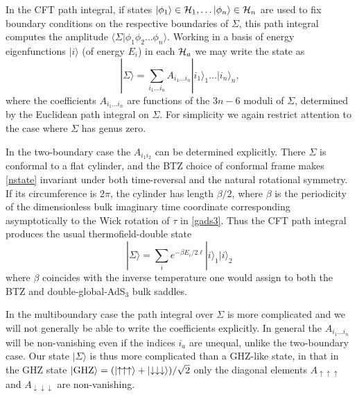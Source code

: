 \documentclass[12pt]{article}
\newcommand{\be}{\begin{equation}}
\newcommand{\ee}{\end{equation}}
\numberwithin{equation}{section}
\begin{document}
In the CFT path integral, if states $|\phi_1\rangle \in {\cal H}_1, \dots |\phi_n\rangle \in {\cal H}_n$ are used to fix boundary conditions on the respective boundaries of $\Sigma$, this path integral computes the amplitude $\langle \Sigma | \phi_1 \phi_2 \dots \phi_n\rangle$.  Working in a
basis of energy eigenfunctions $|i \rangle$ (of energy $E_i$) in each ${\cal H}_a$ we may write the state as
%
\be \label{nstate}
|\Sigma \rangle = \sum_{i_1 \ldots i_n} A_{i_1 \ldots i_n} |i_1 \rangle_1 \ldots  |i_n \rangle_n,
\ee
%
where the coefficients $A_{i_1 \ldots i_n}$ are functions of the $3n-6$ moduli of $\Sigma$, determined by the Euclidean path integral on $\Sigma$. For simplicity we again restrict attention to the case where $\Sigma$ has genus zero.

In the two-boundary case the $A_{i_1 i_2}$ can be determined explicitly. There $\Sigma$ is conformal to a flat cylinder, and the BTZ choice of conformal frame makes \eqref{nstate} invariant under both time-reversal and the natural rotational symmetry.  If its circumference is $2 \pi$, the cylinder has length $\beta/2$, where $\beta$ is the periodicity of the dimensionless bulk imaginary time coordinate corresponding asymptotically to the Wick rotation of $\tau$ in \eqref{gads3}.  Thus the CFT path integral produces the usual thermofield-double state
%
\be \label{tfd}
|\Sigma \rangle = \sum_i e^{-\beta E_i/2 \ell} |i\rangle_1 |i\rangle_2 \,
\ee
%
where $\beta$ coincides with the inverse temperature one would assign to both the BTZ and double-global-AdS${}_3$ bulk saddles.


In the multiboundary case the path integral over $\Sigma$ is more complicated and we will not generally be able to write the coefficients explicitly. In general the $A_{i_1\ldots i_n}$ will be non-vanishing even if the indices $i_a$ are unequal, unlike the two-boundary case.
Our state $|\Sigma\rangle$ is thus more complicated than a GHZ-like state, in that in the GHZ state
$|{\rm GHZ}\rangle = (\left|\uparrow \uparrow \uparrow \right\rangle + \left|\downarrow \downarrow \downarrow \right\rangle ) / \sqrt{2}$ only the diagonal elements $A_{\uparrow\uparrow\uparrow}$ and $A_{\downarrow \downarrow \downarrow}$ are non-vanishing.
\end{document}
